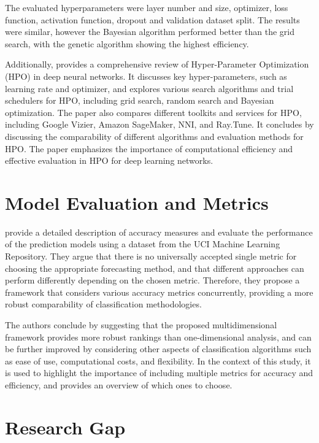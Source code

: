 The evaluated hyperparameters were layer number and size, optimizer, loss function, activation function, dropout and validation dataset split. The results were similar, however the Bayesian algorithm performed better than the grid search, with the genetic algorithm showing the highest efficiency.

Additionally, \textcite{new6} provides a comprehensive review of Hyper-Parameter Optimization (HPO) in deep neural networks. It discusses key hyper-parameters, such as learning rate and optimizer, and explores various search algorithms and trial schedulers for HPO, including grid search, random search and Bayesian optimization. The paper also compares different toolkits and services for HPO, including Google Vizier, Amazon SageMaker, NNI, and Ray.Tune. It concludes by discussing the comparability of different algorithms and evaluation methods for HPO. The paper emphasizes the importance of computational efficiency and effective evaluation in HPO for deep learning networks.

\section{Model Evaluation and Metrics}

\textcite{evaluation-metrics} provide a detailed description of accuracy measures and evaluate the performance of the prediction models using a dataset from the UCI Machine Learning Repository. They argue that there is no universally accepted single metric for choosing the appropriate forecasting method, and that different approaches can perform differently depending on the chosen metric. Therefore, they propose a framework that considers various accuracy metrics concurrently, providing a more robust comparability of classification methodologies.

The authors conclude by suggesting that the proposed multidimensional framework provides more robust rankings than one-dimensional analysis, and can be further improved by considering other aspects of classification algorithms such as ease of use, computational costs, and flexibility. In the context of this study, it is used to highlight the importance of including multiple metrics for accuracy and efficiency, and provides an overview of which ones to choose.

\section{Research Gap}

